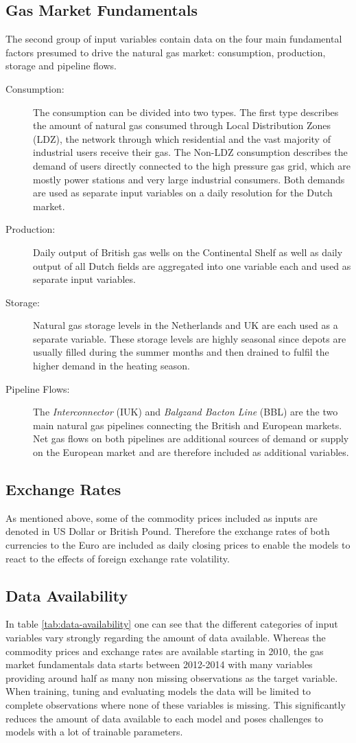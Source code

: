 \subsection{Gas Market Fundamentals}
The second group of input variables contain data on the four main fundamental factors presumed to drive the natural gas market: consumption, production, storage and pipeline flows. 
\begin{description}
\item[Consumption:] The consumption can be divided into two types. The first type describes the amount of natural gas consumed through Local Distribution Zones (LDZ), the network through which residential and the vast majority of industrial users receive their gas. The Non-LDZ consumption describes the demand of users directly connected to the high pressure gas grid, which are mostly power stations and very large industrial consumers. Both demands are used as separate input variables on a daily resolution for the Dutch market.
\item[Production:] Daily output of British gas wells on the Continental Shelf as well as daily output of all Dutch fields are aggregated into one variable each and used as separate input variables.
\item[Storage:] Natural gas storage levels in the Netherlands and UK are each used as a separate variable. These storage levels are highly seasonal since depots are usually filled during the summer months and then drained to fulfil the higher demand in the heating season.
\item[Pipeline Flows:] The \textit{Interconnector} (IUK) and \textit{Balgzand Bacton Line} (BBL) are the two main natural gas pipelines connecting the British and European markets. Net gas flows on both pipelines are additional sources of demand or supply on the European market and are therefore included as additional variables.
\end{description}
\subsection{Exchange Rates}
As mentioned above, some of the commodity prices included as inputs are denoted in US Dollar or British Pound. Therefore the exchange rates of both currencies to the Euro are included as daily closing prices to enable the models to react to the effects of foreign exchange rate volatility.
\subsection{Data Availability}\label{Sec:Data-Availability}
In table \ref{tab:data-availability} one can see that the different categories of input variables vary strongly regarding the amount of data available. Whereas the commodity prices and exchange rates are available starting in 2010, the gas market fundamentals data starts between 2012-2014 with many variables providing around half as many non missing observations as the target variable. When training, tuning and evaluating models the data will be limited to complete observations where none of these variables is missing. This significantly reduces the amount of data available to each model and poses challenges to models with a lot of trainable parameters.

